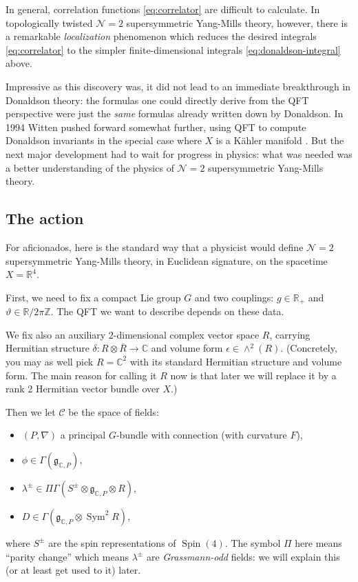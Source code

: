 \documentclass[12pt,letterpaper,reqno]{article}
\numberwithin{equation}{section}
\newcommand{\fg}{{\mathfrak g}}
\newcommand{\cC}{\ensuremath{\mathcal C}}
\newcommand{\R}{\ensuremath{\mathbb R}}
\newcommand{\C}{\ensuremath{\mathbb C}}
\newcommand{\Z}{\ensuremath{\mathbb Z}}
\newcommand{\N}{{\mathcal N}}
\newcommand{\kahler}{K\"ahler\xspace}
\newcommand{\eps}{\epsilon}
\newcommand{\ti}[1]{\textit{#1}}
\DeclareMathOperator{\Sym}{Sym}
\DeclareMathOperator{\Spin}{Spin}
\begin{document}
In general, correlation functions \eqref{eq:correlator}
are difficult to calculate.
In topologically twisted $\N=2$ supersymmetric Yang-Mills theory, 
however, there is a remarkable
\ti{localization} phenomenon which reduces the desired
integrals \eqref{eq:correlator} to the simpler
finite-dimensional integrals \eqref{eq:donaldson-integral} above.


Impressive as this discovery was, it did not lead to an immediate
breakthrough in Donaldson theory:
the formulas one could directly
derive from the QFT perspective were just the \ti{same} formulas
already written down by Donaldson. In 1994 Witten
pushed forward somewhat further, using QFT to compute Donaldson invariants
in the special case where $X$ is a 
\kahler manifold \cite{Witten:1994ev}. But the next major development 
had to wait for progress in physics: what was needed was a better understanding of the 
physics of $\N=2$ supersymmetric Yang-Mills theory.


\subsection{The action} \label{sec:intro-action}

For aficionados, here is
the standard way that a physicist would define
$\N=2$ supersymmetric Yang-Mills theory, in Euclidean signature,
on the spacetime $X = \R^4$.

First, we need to fix a compact Lie group $G$ and two couplings: $g \in \R_+$ and
$\vartheta \in \R / 2 \pi \Z$. The QFT we want to describe depends on these
data.

We fix also an auxiliary $2$-dimensional complex vector space $R$, carrying
Hermitian structure $\delta: R \otimes \overline R \to \C$
and volume form $\eps \in \wedge^2(R)$. (Concretely, you may as well pick
$R = \C^2$ with its standard Hermitian structure and volume form. The main reason for
calling it $R$ now is that later we will replace it by a rank $2$ Hermitian
vector bundle over $X$.)

Then we let $\cC$ be the space of fields:
\begin{itemize}
\item $(P,\nabla)$ a principal $G$-bundle with connection (with curvature $F$),
\item $\phi \in \Gamma(\fg_{\C,P})$,
\item $\lambda^\pm \in \Pi \Gamma(S^\pm \otimes \fg_{\C,P} \otimes R)$,
\item $D \in \Gamma(\fg_{\C,P} \otimes \Sym^2 R)$,
\end{itemize}
where $S^\pm$ are the spin representations of $\Spin(4)$. The symbol $\Pi$ here means ``parity change''
which means $\lambda^\pm$ are \ti{Grassmann-odd} fields: we will explain this (or at least get used to it)
later.
\end{document}
